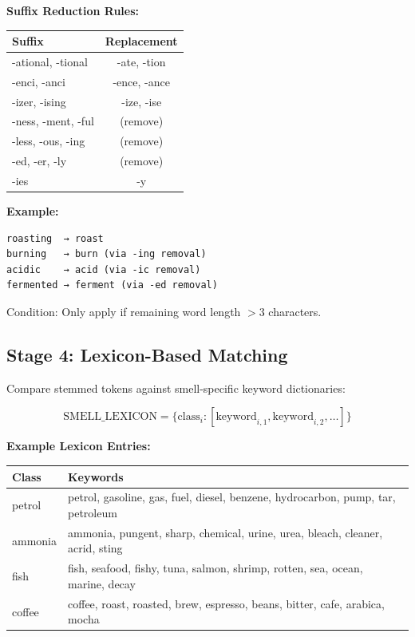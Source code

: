 \documentclass[10pt]{article}
\begin{document}
\textbf{Suffix Reduction Rules:}

\begin{table}[ht]
\centering
\small
\begin{tabular}{|l|c|}
\hline
\textbf{Suffix} & \textbf{Replacement} \\
\hline
-ational, -tional & -ate, -tion \\
-enci, -anci & -ence, -ance \\
-izer, -ising & -ize, -ise \\
-ness, -ment, -ful & (remove) \\
-less, -ous, -ing & (remove) \\
-ed, -er, -ly & (remove) \\
-ies & -y \\
\hline
\end{tabular}
\end{table}

\textbf{Example:}
\begin{verbatim}
roasting  → roast
burning   → burn (via -ing removal)
acidic    → acid (via -ic removal)
fermented → ferment (via -ed removal)
\end{verbatim}

Condition: Only apply if remaining word length $> 3$ characters.

\subsection{Stage 4: Lexicon-Based Matching}

Compare stemmed tokens against smell-specific keyword dictionaries:

\[
\text{SMELL\_LEXICON} = \{ \text{class}_i : [\text{keyword}_{i,1}, \text{keyword}_{i,2}, \ldots] \}
\]

\textbf{Example Lexicon Entries:}

\begin{table}[ht]
\centering
\small
\begin{tabular}{|l|l|}
\hline
\textbf{Class} & \textbf{Keywords} \\
\hline
petrol & petrol, gasoline, gas, fuel, diesel, benzene, hydrocarbon, pump, tar, petroleum \\
ammonia & ammonia, pungent, sharp, chemical, urine, urea, bleach, cleaner, acrid, sting \\
fish & fish, seafood, fishy, tuna, salmon, shrimp, rotten, sea, ocean, marine, decay \\
coffee & coffee, roast, roasted, brew, espresso, beans, bitter, cafe, arabica, mocha \\
\hline
\end{tabular}
\end{table}
\end{document}
